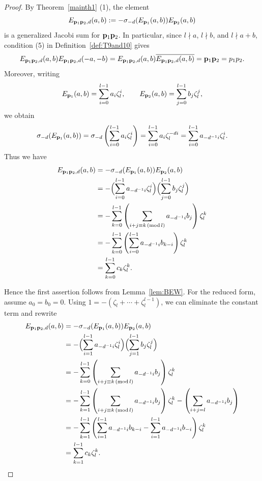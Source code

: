 \documentclass[a4paper, 11pt]{amsart}
\theoremstyle{plain}
\theoremstyle{definition}
\numberwithin{equation}{section}
\begin{document}
\begin{proof}
By Theorem~\ref{mainth1} (1), the element
\[
E_{{\bf p}_1{\bf p}_2,d}(a,b):=-\sigma_{-d}(E_{{\bf p}_1}(a,b))E_{{\bf p}_2}(a,b)
\]
is a generalized Jacobi sum for ${\bf p}_1{\bf p}_2$. 
In particular, since $l\nmid a$, $l\nmid b$, and $l\nmid a+b$, condition (5) in
Definition~\ref{def:T9and10} gives
\[
E_{{\bf p}_1{\bf p}_2,d}(a,b)E_{{\bf p}_1{\bf p}_2,d}(-a,-b) =E_{{\bf p}_1{\bf p}_2,d}(a,b)\overline{E_{{\bf p}_1{\bf p}_2,d}(a,b)}= {\bf p}_1{\bf p}_2=p_1p_2.
\]
Moreover, writing
\[
E_{{\bf p}_1}(a,b)=\sum_{i=0}^{l-1} a_i\zeta_l^i,
\qquad
E_{{\bf p}_2}(a,b)=\sum_{j=0}^{l-1} b_j\zeta_l^j,
\]
we obtain
\[
\sigma_{-d}(E_{{\bf p}_1}(a,b))
=\sigma_{-d}\left(\sum_{i=0}^{l-1}a_i\zeta_l^i\right)
=\sum_{i=0}^{l-1}a_i\zeta_l^{-di}
=\sum_{i=0}^{l-1}a_{-d^{-1}i}\zeta_l^i.
\]
Thus we have
\begin{align*}
E_{{\bf p}_1{\bf p}_2,d}(a,b)
&= -\sigma_{-d}(E_{{\bf p}_1}(a,b))E_{{\bf p}_2}(a,b)\\
&=-\Bigl(\sum_{i=0}^{l-1}a_{-d^{-1}i}\zeta_l^i\Bigr) \Bigl(\sum_{j=0}^{l-1}b_j\zeta_l^j\Bigr)\\
&= -\sum_{k=0}^{l-1}\left(\sum_{i+j\equiv k \,({\rm mod}\,l)}a_{-d^{-1}i}b_j\right)\zeta_l^k \\
&=-\sum_{k=0}^{l-1}\left(\sum_{i=0}^{l-1}a_{-d^{-1}i}b_{k-i}\right)\zeta_l^k\\
&=\sum_{k=0}^{l-1}c_k\zeta_l^k.
\end{align*}

Hence the first assertion follows from Lemma~\ref{lem:BEW}. 
For the reduced form, assume $a_0=b_0=0$. 
Using $1=-(\zeta_l+\cdots+\zeta_l^{l-1})$,
we can eliminate the constant term and rewrite
\begin{align*}
E_{{\bf p}_1{\bf p}_2,d}(a,b)
&= -\sigma_{-d}(E_{{\bf p}_1}(a,b))E_{{\bf p}_2}(a,b)\\
&=-\Bigl(\sum_{i=1}^{l-1}a_{-d^{-1}i}\zeta_l^i\Bigr) \Bigl(\sum_{j=1}^{l-1}b_j\zeta_l^j\Bigr)\\
&= -\sum_{k=0}^{l-1}\left(\sum_{i+j\equiv k \,({\rm mod}\,l)}a_{-d^{-1}i}b_j\right)\zeta_l^k \\
&= -\sum_{k=1}^{l-1}\left(\sum_{i+j\equiv k \,({\rm mod}\,l)}a_{-d^{-1}i}b_j\right)\zeta_l^k 
- \left( \sum_{i+j=l}a_{-d^{-1}i}b_j\right)\\
&=-\sum_{k=1}^{l-1}\left(\sum_{i=1}^{l-1}a_{-d^{-1}i}b_{k-i} - \sum_{i=1}^{l-1}a_{-d^{-1}i}b_{-i}\right)\zeta_l^k\\
&=\sum_{k=1}^{l-1}c_k\zeta_l^k.
\end{align*}
\end{proof}
\end{document}
